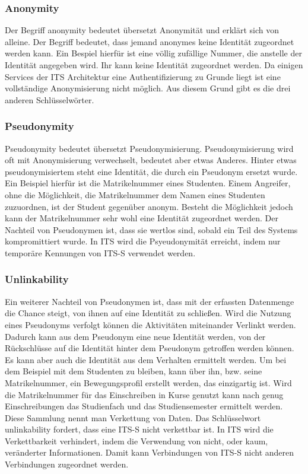 \subsubsection{Anonymity}
Der Begriff anonymity bedeutet übersetzt Anonymität und erklärt sich von alleine. Der Begriff bedeutet, dass jemand anonymes keine Identität zugeordnet werden kann. Ein Bespiel hierfür ist eine völlig zufällige Nummer, die anstelle der Identität angegeben wird. Ihr kann keine Identität zugeordnet werden. Da einigen Services der \ac{ITS} Architektur eine Authentifizierung zu Grunde liegt ist eine vollständige Anonymisierung nicht möglich. Aus diesem Grund gibt es die drei anderen Schlüsselwörter.

\subsubsection{Pseudonymity}
Pseudonymity bedeutet übersetzt Pseudonymisierung.  Pseudonymisierung wird oft mit Anonymisierung verwechselt, bedeutet aber etwas Anderes. Hinter etwas pseudonymisiertem steht eine Identität, die durch ein Pseudonym ersetzt wurde. Ein Beispiel hierfür ist die Matrikelnummer eines Studenten. Einem Angreifer, ohne die Möglichkeit, die Matrikelnummer dem Namen eines Studenten zuzuordnen, ist der Student gegenüber anonym. Besteht die Möglichkeit jedoch kann der Matrikelnummer sehr wohl eine Identität zugeordnet werden. Der Nachteil von Pseudonymen ist, dass sie wertlos sind, sobald ein Teil des Systems kompromittiert wurde. In \ac{ITS} wird die  Psyeudonymität erreicht, indem nur temporäre Kennungen von \ac{ITS-S} verwendet werden.


\subsubsection{Unlinkability}
Ein weiterer Nachteil von Pseudonymen ist, dass mit der erfassten Datenmenge die Chance steigt, von ihnen auf eine Identität zu schließen. Wird die Nutzung eines Pseudonyms verfolgt können die Aktivitäten miteinander Verlinkt werden. Dadurch kann aus dem Pseudonym eine neue Identität werden, von der Rückschlüsse auf die Identität hinter dem Pseudonym getroffen werden können. Es kann aber auch die Identität aus dem Verhalten ermittelt werden. Um bei dem Beispiel mit dem Studenten zu bleiben, kann über ihn, bzw. seine Matrikelnummer, ein Bewegungsprofil erstellt werden, das  einzigartig ist. Wird die Matrikelnummer für das Einschreiben in Kurse genutzt kann nach genug Einschreibungen das Studienfach und das Studiensemester ermittelt werden. Diese Sammlung nennt man Verkettung von Daten. Das Schlüsselwort unlinkability fordert, dass eine \ac{ITS-S} nicht verkettbar ist. In \ac{ITS} wird die Verkettbarkeit verhindert, indem die Verwendung von nicht, oder kaum, veränderter Informationen. Damit kann Verbindungen von \ac{ITS-S} nicht anderen Verbindungen zugeordnet werden.

